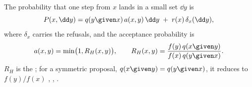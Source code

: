 \begin{workdef}
The probability that one step from $x$ lands in a small set $\dd y$ is
\begin{equation}
  P(x,\dd y)=q(y\given x)\,a(x,y)\,\dd y\;+\;r(x)\,\delta_x(\dd y),
  \label{9b:eq:mh-kernel}
\end{equation}
where $\delta_x$  carries the
refusals, and the acceptance probability is
\begin{equation}
  a(x,y)=\min\bigl(1,R_H(x,y)\bigr),
  \qquad
  R_H(x,y)=\frac{f(y)\,q(x\given y)}{f(x)\,q(y\given x)} .
  \label{9b:eq:hastings-ratio}
\end{equation}
$R_H$ is the  ; for a symmetric proposal, $q(x\given y)=q(y\given x)$, it
reduces to $f(y)/f(x)$ , ,
.
\end{workdef}

